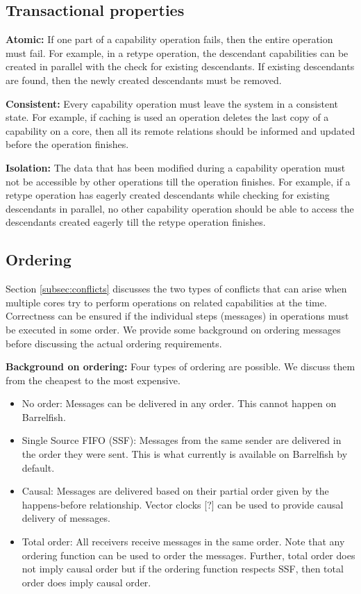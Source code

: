 \documentclass[a4paper,twoside]{report} %
\begin{document}
\subsection{Transactional properties}
\textbf{Atomic:} If one part of a capability operation fails, then the
entire operation must fail. For example, in a retype operation, the
descendant capabilities can be created in parallel with the check for
existing descendants. If existing descendants are found, then the
newly created descendants must be removed.

\textbf{Consistent:} Every capability operation must leave the system
in a consistent state. For example, if caching is used an operation
deletes the last copy of a capability on a core, then all its remote
relations should be informed and updated before the operation
finishes.

\textbf{Isolation:} The data that has been modified during a
capability operation must not be accessible by other operations till
the operation finishes. For example, if a retype operation has eagerly
created descendants while checking for existing descendants in
parallel, no other capability operation should be able to access the
descendants created eagerly till the retype operation finishes.

\subsection{Ordering}
Section \ref{subsec:conflicts} discusses the two types of conflicts
that can arise when multiple cores try to perform operations on
related capabilities at the time. Correctness can be ensured if the
individual steps (messages) in operations must be executed in some
order.  We provide some background on ordering messages before
discussing the actual ordering requirements.

\textbf{Background on ordering:} Four types of ordering are
possible. We discuss them from the cheapest to the most expensive.

\begin{itemize}
\item No order: Messages can be delivered in any order. This cannot
  happen on Barrelfish.
\item Single Source FIFO (SSF): Messages from the same sender are
  delivered in the order they were sent. This is what currently is
  available on Barrelfish by default.
\item Causal: Messages are delivered based on their partial order
  given by the happens-before relationship. Vector clocks [?] can be
  used to provide causal delivery of messages.
\item Total order: All receivers receive messages in the same
  order. Note that any ordering function can be used to order the
  messages. Further, total order does not imply causal order but if
  the ordering function respects SSF, then total order does imply
  causal order.
\end{itemize}
\end{document}
